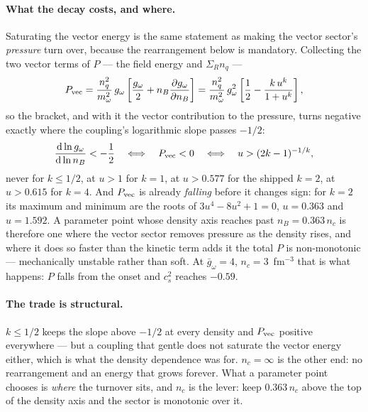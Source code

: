 \documentclass[11pt,a4paper]{article}
\begin{document}
\paragraph{What the decay costs, and where.} Saturating the vector energy is
the same statement as making the vector sector's \emph{pressure} turn over,
because the rearrangement below is mandatory. Collecting the two vector terms
of $P$ --- the field energy and $\Sigma_R n_q$ ---
\begin{equation}
P_{\rm vec}
 = \frac{n_q^2}{m_\omega^2}\,g_\omega
   \left[\frac{g_\omega}{2}+n_B\frac{\partial g_\omega}{\partial n_B}\right]
 = \frac{n_q^2}{m_\omega^2}\,g_\omega^2
   \left[\frac12-\frac{k\,u^{k}}{1+u^{k}}\right],
\label{eq:Pvec}
\end{equation}
so the bracket, and with it the vector contribution to the pressure, turns
negative exactly where the coupling's logarithmic slope passes $-1/2$:
\begin{equation}
\frac{\mathrm{d}\ln g_\omega}{\mathrm{d}\ln n_B}<-\frac12
\quad\Longleftrightarrow\quad
P_{\rm vec}<0
\quad\Longleftrightarrow\quad
u>(2k-1)^{-1/k},
\end{equation}
never for $k\le1/2$, at $u>1$ for $k=1$, at $u>0.577$ for the shipped $k=2$,
at $u>0.615$ for $k=4$. And $P_{\rm vec}$ is already \emph{falling} before it
changes sign: for $k=2$ its maximum and minimum are the roots of
$3u^4-8u^2+1=0$, $u=0.363$ and $u=1.592$. A parameter point whose density axis
reaches past $n_B=0.363\,n_c$ is therefore one where the vector sector removes
pressure as the density rises, and where it does so faster than the kinetic
term adds it the total $P$ is non-monotonic --- mechanically unstable rather
than soft. At $\bar g_\omega=4$, $n_c=3$~fm$^{-3}$ that is what happens: $P$
falls from the onset and $c_s^2$ reaches $-0.59$.

\paragraph{The trade is structural.} $k\le1/2$ keeps the slope above $-1/2$ at
every density and $P_{\rm vec}$ positive everywhere --- but a coupling that
gentle does not saturate the vector energy either, which is what the density
dependence was for. $n_c=\infty$ is the other end: no rearrangement and an
energy that grows forever. What a parameter point chooses is \emph{where} the
turnover sits, and $n_c$ is the lever: keep $0.363\,n_c$ above the top of the
density axis and the sector is monotonic over it.
\end{document}

